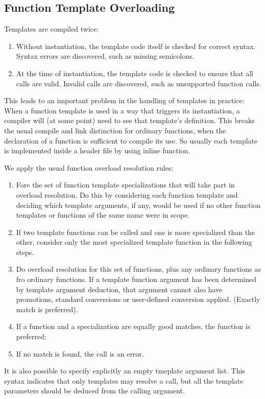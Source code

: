 \documentclass[11pt, a4paper]{book}
\begin{document}
\subsection{Function Template Overloading}
Templates are compiled twice:
\begin{enumerate}
\item Without instantiation, the template code itself is checked for correct syntax. Syntax errors are discovered, such as missing semicolons.
\item At the time of instantiation, the template code is checked to ensure that all calls are valid. Invalid calls are discovered, such as unsupported function calls.

\end{enumerate}
This leads to an important problem in the handling of templates in practice: When a function template is used in a way that triggers its instantiation, a compiler will (at some point) need to see that template's definition. This breaks the usual compile and link distinction for ordinary functions, when the declaration of a function is sufficient to compile its use. So usually each template is implemented inside a header file by using inline function.

We apply the usual function overload resolution rules:
\begin{enumerate}
	\item Fore the set of function template specializations that will take part in overload resolution. Do this by considering each function template and deciding which template arguments, if any, would be used if no other function templates or functions of the same name were in scope.
	\item If two template functions can be called and one is more specialized than the other, consider only the most specialized template function in the following steps.
	\item Do overload resolution for this set of functions, plus any ordinary functions as fro ordinary functions. If a template function argument has been determined by template argument deduction, that argument cannot also have promotions, standard conversions or user-defined conversion applied. (Exactly match is preferred).	
	\item If a function and a specialization are equally good matches, the function is preferred;
	\item If no match is found, the call is an error.
\end{enumerate}
It is also possible to specify explicitly an empty tmeplate argument list. This syntax indicates that only templates may resolve a call, but all the template parameters should be deduced from the calling argument.
\end{document}
